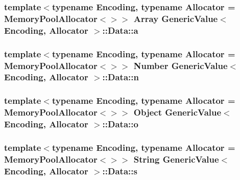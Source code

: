 \subsubsection[{\texorpdfstring{a}{a}}]{\setlength{\rightskip}{0pt plus 5cm}template$<$typename Encoding, typename Allocator = Memory\+Pool\+Allocator$<$$>$$>$ {\bf Array} {\bf Generic\+Value}$<$ Encoding, Allocator $>$\+::Data\+::a}\hypertarget{unionGenericValue_1_1Data_a1935b99b33ec9deff9f6360f8fa7b812}{}\label{unionGenericValue_1_1Data_a1935b99b33ec9deff9f6360f8fa7b812}
\subsubsection[{\texorpdfstring{n}{n}}]{\setlength{\rightskip}{0pt plus 5cm}template$<$typename Encoding, typename Allocator = Memory\+Pool\+Allocator$<$$>$$>$ {\bf Number} {\bf Generic\+Value}$<$ Encoding, Allocator $>$\+::Data\+::n}\hypertarget{unionGenericValue_1_1Data_a243007cce2f4b75bea3e3c1ee4c3c239}{}\label{unionGenericValue_1_1Data_a243007cce2f4b75bea3e3c1ee4c3c239}
\subsubsection[{\texorpdfstring{o}{o}}]{\setlength{\rightskip}{0pt plus 5cm}template$<$typename Encoding, typename Allocator = Memory\+Pool\+Allocator$<$$>$$>$ {\bf Object} {\bf Generic\+Value}$<$ Encoding, Allocator $>$\+::Data\+::o}\hypertarget{unionGenericValue_1_1Data_a15c6847aa3272560aaff5e7ed4320a7f}{}\label{unionGenericValue_1_1Data_a15c6847aa3272560aaff5e7ed4320a7f}
\subsubsection[{\texorpdfstring{s}{s}}]{\setlength{\rightskip}{0pt plus 5cm}template$<$typename Encoding, typename Allocator = Memory\+Pool\+Allocator$<$$>$$>$ {\bf String} {\bf Generic\+Value}$<$ Encoding, Allocator $>$\+::Data\+::s}\hypertarget{unionGenericValue_1_1Data_a6872a4b93763944063b425e6c001ed2b}{}\label{unionGenericValue_1_1Data_a6872a4b93763944063b425e6c001ed2b}
